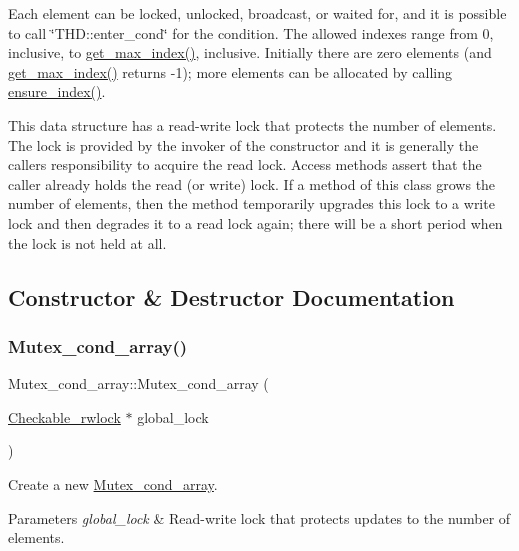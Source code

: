 Each element can be locked, unlocked, broadcast, or waited for, and it is possible to call \char`\"{}\+T\+H\+D\+::enter\+\_\+cond\char`\"{} for the condition. The allowed indexes range from 0, inclusive, to \mbox{\hyperlink{classMutex__cond__array_a06799cb9027245967b4e372390a43514}{get\+\_\+max\+\_\+index()}}, inclusive. Initially there are zero elements (and \mbox{\hyperlink{classMutex__cond__array_a06799cb9027245967b4e372390a43514}{get\+\_\+max\+\_\+index()}} returns -\/1); more elements can be allocated by calling \mbox{\hyperlink{classMutex__cond__array_a36690cb3001e20bc5900abce919ea4e1}{ensure\+\_\+index()}}.

This data structure has a read-\/write lock that protects the number of elements. The lock is provided by the invoker of the constructor and it is generally the caller\textquotesingle{}s responsibility to acquire the read lock. Access methods assert that the caller already holds the read (or write) lock. If a method of this class grows the number of elements, then the method temporarily upgrades this lock to a write lock and then degrades it to a read lock again; there will be a short period when the lock is not held at all. 

\subsection{Constructor \& Destructor Documentation}
\mbox{\label{classMutex__cond__array_a7daf69af88f2693e9d8ba87a5fa59c2b}} 
\subsubsection{\texorpdfstring{Mutex\+\_\+cond\+\_\+array()}{Mutex\_cond\_array()}}
{\footnotesize\ttfamily Mutex\+\_\+cond\+\_\+array\+::\+Mutex\+\_\+cond\+\_\+array (\begin{DoxyParamCaption}\item[{\mbox{\hyperlink{classCheckable__rwlock}{Checkable\+\_\+rwlock}} $\ast$}]{global\+\_\+lock }\end{DoxyParamCaption})}

Create a new \mbox{\hyperlink{classMutex__cond__array}{Mutex\+\_\+cond\+\_\+array}}.


\begin{DoxyParams}{Parameters}
{\em global\+\_\+lock} & Read-\/write lock that protects updates to the number of elements. \\
\hline
\end{DoxyParams}


